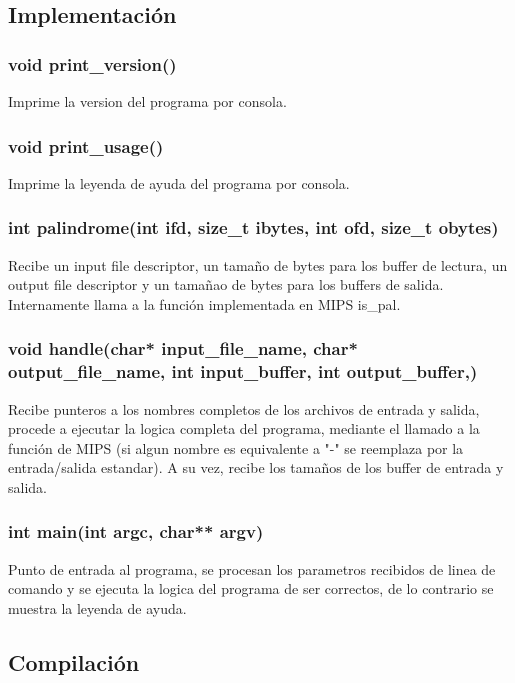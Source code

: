 \documentclass[10pt,a4paper]{article}
\begin{document}
\subsection{Implementación}

\subsubsection{void print\_version()}

Imprime la version del programa por consola.

\subsubsection{void print\_usage()}

Imprime la leyenda de ayuda del programa por consola.

\subsubsection{int palindrome(int ifd, size\_t ibytes, int ofd, size\_t obytes)}

Recibe un input file descriptor, un tamaño de bytes para los buffer de lectura, un output file descriptor y un tamañao de bytes para los buffers de salida. Internamente llama a la función implementada en MIPS is\_pal.

\subsubsection{void handle(char* input\_file\_name, char* output\_file\_name, int input\_buffer, int output\_buffer,)}

Recibe punteros a los nombres completos de los archivos de entrada y salida, procede a ejecutar la logica completa del programa, mediante el llamado a la función de MIPS (si algun nombre es equivalente a "-" se reemplaza por la entrada/salida estandar). A su vez, recibe los tamaños de los buffer de entrada y salida.

\subsubsection{int main(int argc, char** argv)}

Punto de entrada al programa, se procesan los parametros recibidos de linea de comando y se ejecuta la logica del programa de ser correctos, de lo contrario se muestra la leyenda de ayuda.

\subsection{Compilación}
\end{document}
